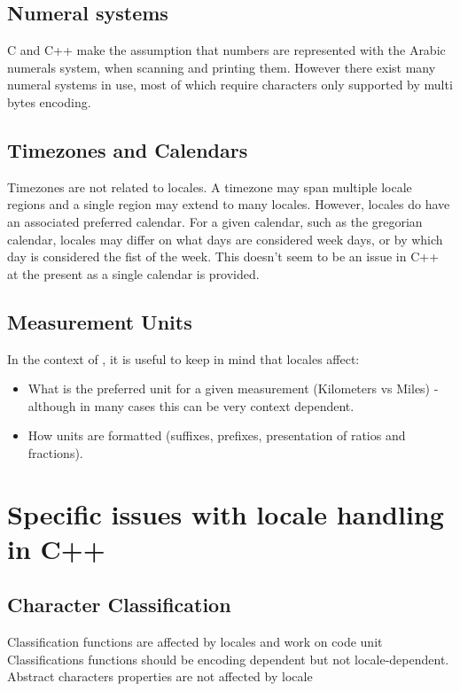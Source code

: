 \documentclass{wg21}
\begin{document}
\subsection{Numeral systems}

C and C++ make the assumption that numbers are represented with the Arabic numerals system, when scanning and printing them.
However there exist many numeral systems in use, most of which require characters only supported by multi bytes encoding.

\subsection{Timezones and Calendars}

Timezones are not related to locales. A timezone may span multiple locale regions and a single region may extend to many locales.
However, locales do have an associated preferred calendar.
For a given calendar, such as the gregorian calendar, locales may differ on what days are considered week days, or by which day is considered the fist of the week.
This doesn't seem to be an issue in C++ at the present as a single calendar is provided.

\subsection{Measurement Units}

In the context of \cite{P1935R1}, it is useful to keep in mind that locales affect:

\begin{itemize}
\item What is the preferred unit for a given measurement (Kilometers vs Miles) - although in many cases this can be very context dependent.
\item How units are formatted (suffixes, prefixes, presentation of ratios and fractions). 
\end{itemize}

\section{Specific issues with locale handling in C++}

\subsection{Character Classification}
Classification functions are affected by locales and work on code unit
Classifications functions should be encoding dependent but not locale-dependent.
Abstract characters properties are not affected by locale
\end{document}

